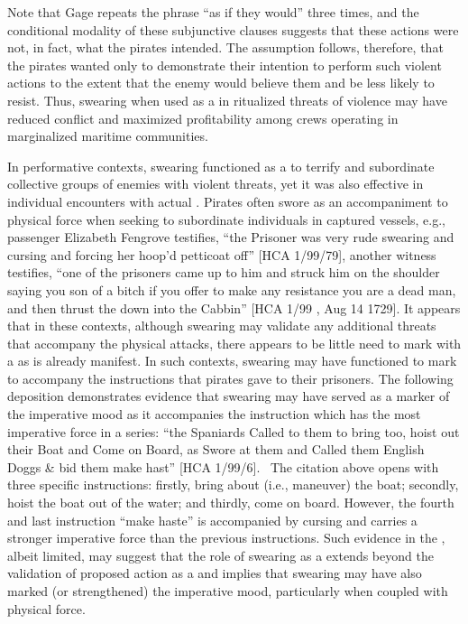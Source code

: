 Note that Gage repeats the phrase “as if they would” three times, and the  conditional modality of these subjunctive clauses suggests that these actions were not, in fact, what the pirates intended. The assumption follows, therefore, that the pirates wanted only to demonstrate their intention to perform such violent actions to the extent that the enemy would believe them and be less likely to resist. Thus, swearing when used as a  in ritualized threats of violence may have reduced conflict and maximized profitability among crews operating in marginalized maritime communities. 

In performative contexts, swearing functioned as a  to terrify and subordinate collective groups of enemies with violent threats, yet it was also effective in individual encounters with actual . Pirates often swore as an accompaniment to physical force when seeking to subordinate individuals in captured vessels, e.g., passenger Elizabeth Fengrove testifies, “the Prisoner was very rude swearing and cursing and forcing her hoop’d petticoat off” [HCA 1/99/79], another witness testifies, “one of the prisoners came up to him and struck him on the shoulder saying you son of a bitch if you offer to make any resistance you are a dead man, and then thrust the  down into the Cabbin” [HCA 1/99 , Aug 14 1729]. It appears that in these contexts, although swearing may validate any additional threats that accompany the physical attacks, there appears to be little need to mark  with a  as  is already manifest. In such contexts, swearing may have functioned to mark  to accompany the instructions that pirates gave to their prisoners. The following deposition demonstrates evidence that swearing may have served as a marker of the imperative mood as it accompanies the instruction which has the most imperative force in a series: “the Spaniards Called to them to bring too, hoist out their Boat and Come on Board, as Swore at them and Called them English Doggs \& bid them make hast” [HCA 1/99/6]. ~The citation above opens with three specific instructions: firstly, bring about (i.e., maneuver) the boat; secondly, hoist the boat out of the water; and thirdly, come on board. However, the fourth and last instruction “make haste” is accompanied by cursing and carries a stronger imperative force than the previous instructions. Such evidence in the , albeit limited, may suggest that the role of swearing as a  extends beyond the validation of proposed action as a  and implies that swearing may have also marked (or strengthened) the imperative mood, particularly when coupled with physical force. 

